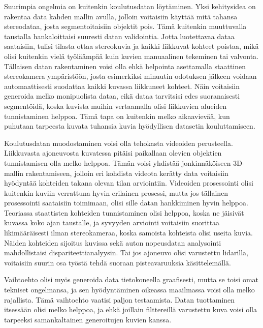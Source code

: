 Suurimpia ongelmia on kuitenkin koulutusdatan löytäminen.
Yksi kehitysidea on rakentaa data kahden mallin avulla, 
jolloin voitaisiin käyttää mitä tahansa stereodataa, josta segmentoitaisiin objektit pois.
Tämä kuitenkin muuttuvalla taustalla hankaloittaisi suuresti datan validointia.
Jotta luotettavaa dataa saataisiin, tulisi tilasta ottaa stereokuvia ja kaikki liikkuvat kohteet poistaa,
mikä olisi kuitenkin vielä työläämpää kuin kuvien manuaalinen tekeminen tai valvonta.
Tällaisen datan rakentaminen voisi olla ehkä helpointa asettamalla staattinen stereokamera ympäristöön,
josta esimerkiksi minuutin odotuksen jälkeen voidaan automaattisesti suodattaa kaikki kuvassa liikkuneet kohteet.
Näin voitaisiin generoida melko monipuolista dataa, eikä dataa tarvitsisi edes suoranaisesti segmentöidä,
koska kuvista muihin vertaamalla olisi liikkuvien alueiden tunnistaminen helppoa.
Tämä tapa on kuitenkin melko aikaavievää, kun puhutaan tarpeesta kuvata tuhansia kuvia hyödyllisen datasetin kouluttamiseen.

Koulutusdatan muodostaminen voisi olla tehokasta videoiden perusteella.
Liikkuvasta ajoneuvosta kuvatessa pitäisi paikallaan olevien objektien tunnistamisen olla melko helppoa.
Tämän voisi yhdistää jonkinnäköiseen 3D-mallin rakentamiseen, jolloin eri kohdista videota kerätty data voitaisiin hyödyntää kohteiden takana olevan tilan arviointiin.
Videoiden prosessointi olisi kuitenkin kuviin verrattuna hyvin erilainen prosessi,
mutta jos tällainen prosessointi saataisiin toimimaan, olisi sille datan hankkiminen hyvin helppoa.
Teoriassa staattisten kohteiden tunnistaminen olisi helppoa, koska ne jäisivät kuvassa koko ajan taustalle,
ja syvyyden arviointi voitaisiin suorittaa likimääräisesti ilman stereokameraa, koska samoista kohteista olisi useita kuvia.
Näiden kohteiden sijoitus kuvissa sekä auton nopeusdatan analysointi mahdollistaisi dispariteettianalyysin.
Tai jos ajoneuvo olisi varustettu lidarilla, voitaisiin suurin osa työstä tehdä suoraan pisteavaruuksia käsittelemällä.

Vaihtoehto olisi myös generoida data tietokoneella graafisesti,
mutta se toisi omat tekniset ongelmansa, ja sen hyödyntäminen oikeassa maailmassa voisi olla melko rajallista.
Tämä vaihtoehto vaatisi paljon testaamista.
Datan tuottaminen itsessään olisi melko helppoa,
ja ehkä joillain filttereillä varustettu kuva voisi olla tarpeeksi samankaltainen generoitujen kuvien kanssa.
